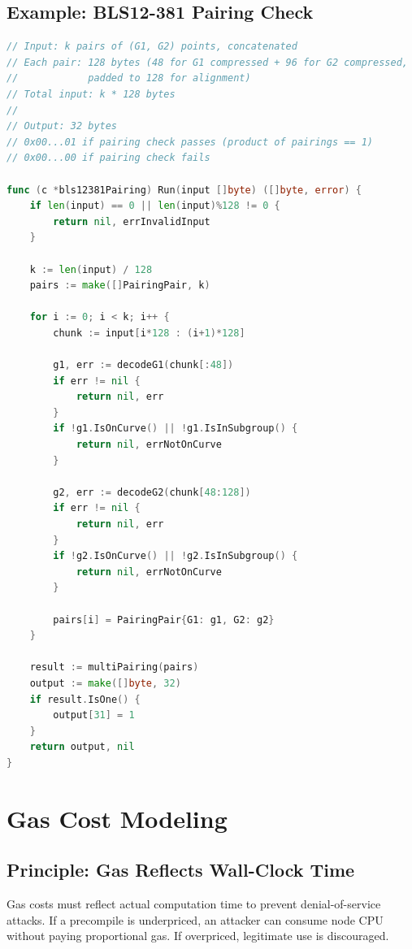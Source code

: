 \documentclass[11pt,a4paper]{article}
\begin{document}
\subsection{Example: BLS12-381 Pairing Check}

\begin{lstlisting}[language=Go,caption={BLS12-381 pairing input/output format}]
// Input: k pairs of (G1, G2) points, concatenated
// Each pair: 128 bytes (48 for G1 compressed + 96 for G2 compressed,
//            padded to 128 for alignment)
// Total input: k * 128 bytes
//
// Output: 32 bytes
// 0x00...01 if pairing check passes (product of pairings == 1)
// 0x00...00 if pairing check fails

func (c *bls12381Pairing) Run(input []byte) ([]byte, error) {
    if len(input) == 0 || len(input)%128 != 0 {
        return nil, errInvalidInput
    }

    k := len(input) / 128
    pairs := make([]PairingPair, k)

    for i := 0; i < k; i++ {
        chunk := input[i*128 : (i+1)*128]

        g1, err := decodeG1(chunk[:48])
        if err != nil {
            return nil, err
        }
        if !g1.IsOnCurve() || !g1.IsInSubgroup() {
            return nil, errNotOnCurve
        }

        g2, err := decodeG2(chunk[48:128])
        if err != nil {
            return nil, err
        }
        if !g2.IsOnCurve() || !g2.IsInSubgroup() {
            return nil, errNotOnCurve
        }

        pairs[i] = PairingPair{G1: g1, G2: g2}
    }

    result := multiPairing(pairs)
    output := make([]byte, 32)
    if result.IsOne() {
        output[31] = 1
    }
    return output, nil
}
\end{lstlisting}

\section{Gas Cost Modeling}

\subsection{Principle: Gas Reflects Wall-Clock Time}

Gas costs must reflect actual computation time to prevent denial-of-service attacks.
If a precompile is underpriced, an attacker can consume node CPU without paying
proportional gas. If overpriced, legitimate use is discouraged.
\end{document}
